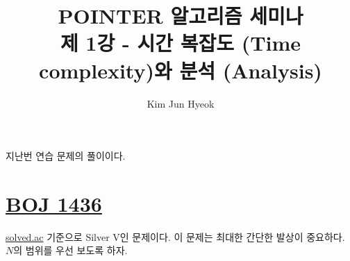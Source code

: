 \documentclass{article}
\begin{document}
    \title{%
    POINTER 알고리즘 세미나 \\
    \large 제 1강 - 시간 복잡도 (Time complexity)와 분석 (Analysis)}
    \author{Kim Jun Hyeok}
    \maketitle
    \linespread{1.25}
    지난번 연습 문제의 풀이이다.
    \section{\href{https://www.acmicpc.net/problem/1436}{BOJ 1436}}
        \href{https://solved.ac}{solved.ac} 기준으로 Silver V인 문제이다.
        이 문제는 최대한 간단한 발상이 중요하다.
        $N$의 범위를 우선 보도록 하자.
\end{document}
